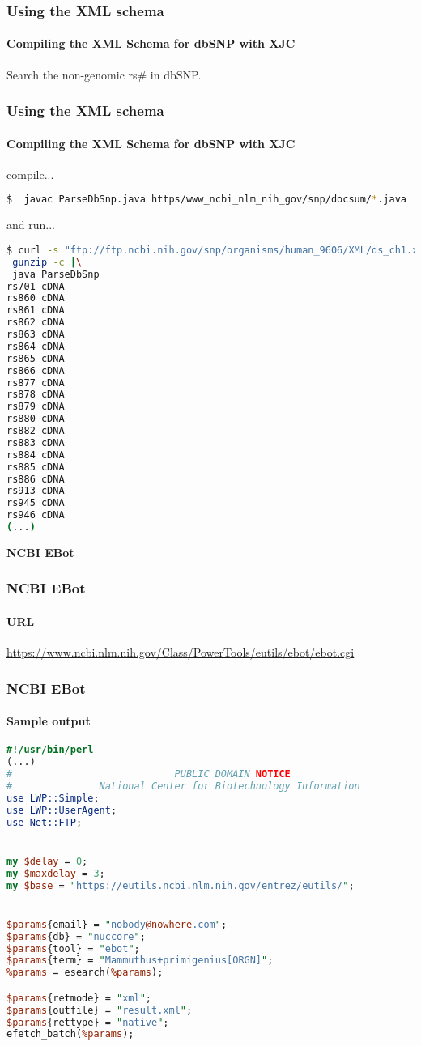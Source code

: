 \documentclass{beamer}
\newcommand{\centeredtitle}[1]{
\begin{center}
    \Huge{\bf{#1}}
\end{center}
}
\newcommand{\hugeslide}[1]{
\begin{frame}
\centeredtitle{#1}
\end{frame}
}
\begin{document}
\begin{frame}[fragile]
\frametitle{Using the XML schema}
\framesubtitle{Compiling the XML Schema for dbSNP with XJC}
Search the non-genomic rs\# in dbSNP.

\end{frame}

\begin{frame}[fragile]
\frametitle{Using the XML schema}
\framesubtitle{Compiling the XML Schema for dbSNP with XJC}
compile...
\begin{lstlisting}[language=bash,basicstyle=\tiny,breaklines=false]
$  javac ParseDbSnp.java https/www_ncbi_nlm_nih_gov/snp/docsum/*.java
\end{lstlisting}
and run...
\begin{lstlisting}[language=bash,basicstyle=\tiny,breaklines=false]
$ curl -s "ftp://ftp.ncbi.nih.gov/snp/organisms/human_9606/XML/ds_ch1.xml.gz" |\
 gunzip -c |\
 java ParseDbSnp
rs701 cDNA
rs860 cDNA
rs861 cDNA
rs862 cDNA
rs863 cDNA
rs864 cDNA
rs865 cDNA
rs866 cDNA
rs877 cDNA
rs878 cDNA
rs879 cDNA
rs880 cDNA
rs882 cDNA
rs883 cDNA
rs884 cDNA
rs885 cDNA
rs886 cDNA
rs913 cDNA
rs945 cDNA
rs946 cDNA
(...)
\end{lstlisting}
\end{frame}


\hugeslide{NCBI EBot}

\begin{frame}[fragile]
\frametitle{NCBI EBot}
\framesubtitle{URL}
\url{https://www.ncbi.nlm.nih.gov/Class/PowerTools/eutils/ebot/ebot.cgi}
\end{frame}

\begin{frame}[fragile]
\frametitle{NCBI EBot}
\framesubtitle{Sample output}
\begin{lstlisting}[language=perl,basicstyle=\tiny,breaklines=true]
#!/usr/bin/perl 
(...)
#                            PUBLIC DOMAIN NOTICE
#               National Center for Biotechnology Information
use LWP::Simple;
use LWP::UserAgent;
use Net::FTP;


my $delay = 0;
my $maxdelay = 3;
my $base = "https://eutils.ncbi.nlm.nih.gov/entrez/eutils/";


$params{email} = "nobody@nowhere.com";
$params{db} = "nuccore";
$params{tool} = "ebot";
$params{term} = "Mammuthus+primigenius[ORGN]";
%params = esearch(%params);

$params{retmode} = "xml";
$params{outfile} = "result.xml";
$params{rettype} = "native";
efetch_batch(%params);
\end{lstlisting}
\end{frame}
\end{document}
